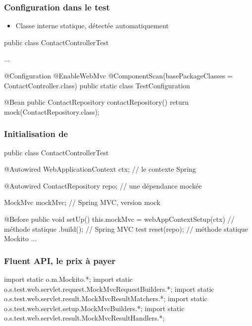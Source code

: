 \begin{frame}[fragile]
 \frametitle{Configuration dans le test}

 \begin{itemize}
  \item Classe interne statique, détectée automatiquement
 \end{itemize}


 \begin{javacode}
public class ContactControllerTest {

  ...

  @Configuration
  @EnableWebMvc
  @ComponentScan(basePackageClasses = ContactController.class)
  public static class TestConfiguration {

      @Bean
      public ContactRepository contactRepository() {
          return mock(ContactRepository.class);
      }

  }
}
 \end{javacode}

\end{frame}

\begin{frame}[fragile]
 \frametitle{Initialisation de }

 \begin{javacode}
public class ContactControllerTest {

    @Autowired
    WebApplicationContext ctx; // le contexte Spring

    @Autowired ContactRepository repo; // une d\'ependance mock\'ee

    MockMvc mockMvc; // Spring MVC, version mock

    @Before public void setUp() {
        this.mockMvc = webAppContextSetup(ctx) // m\'ethode statique
          .build();                            // Spring MVC test
        reset(repo); // m\'ethode statique Mockito
    }
    ...
}
 \end{javacode}


\end{frame}

\begin{frame}[fragile]
 \frametitle{Fluent API, le prix à payer}

 \begin{javacode}
import static o.m.Mockito.*;
import static o.s.test.web.servlet.request.MockMvcRequestBuilders.*;
import static o.s.test.web.servlet.result.MockMvcResultMatchers.*;
import static o.s.test.web.servlet.setup.MockMvcBuilders.*;
import static o.s.test.web.servlet.result.MockMvcResultHandlers.*;
 \end{javacode}


\end{frame}

